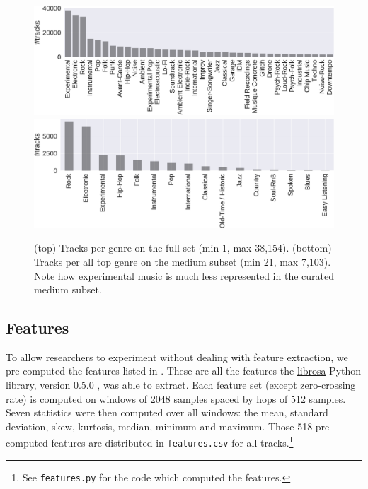 \documentclass{article}
\begin{document}
\begin{figure}[t]
	\centering
	\includegraphics[width=\linewidth]{genre_distribution.pdf}
	\\ \vspace{1em}
	\includegraphics[width=\linewidth]{genre_top_distribution.pdf}
	\caption{(top) Tracks per genre on the full set (min 1, max 38,154). (bottom) Tracks per all top genre on the medium subset (min 21, max 7,103). Note how experimental music is much less represented in the curated medium subset.}
	\label{fig:genre_distribution}
	\label{fig:genre_top_distribution}
\end{figure}

\subsection{Features} %

To allow researchers to experiment without dealing with feature extraction, we pre-computed the features listed in . These are all the features the \href{https://github.com/librosa/librosa}{librosa} Python library, version 0.5.0 \cite{librosa}, was able to extract.
Each feature set (except zero-crossing rate) is computed on windows of 2048 samples spaced by hops of 512 samples. Seven statistics were then computed over all windows: the mean, standard deviation, skew, kurtosis, median, minimum and maximum.
Those 518 pre-computed features are distributed in \texttt{features.csv} for all tracks.\footnote{See \texttt{features.py} for the code which computed the features.}
\end{document}
